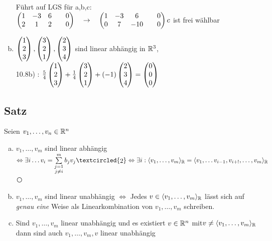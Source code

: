 \begin{enumerate}[a)]
Führt auf LGS für a,b,c:\\
$\begin{pmatrix}
1&-3&6&&0\\
2&1&2&&0
\end{pmatrix}\quad\rightarrow\quad \begin{pmatrix}
1&-3&6&&0\\
0&7&-10&&0
\end{pmatrix}\\
c$ ist frei wählbar
\item $\begin{pmatrix} 1\\2\\3 \end{pmatrix}, \begin{pmatrix} 3\\2\\1 \end{pmatrix}, \begin{pmatrix} 2\\3\\4 \end{pmatrix}$ sind linear abhängig in $\mathbb{R}^3$,\\
10.8b) : $\frac54 \begin{pmatrix} 1\\2\\3 \end{pmatrix} + \frac14 \begin{pmatrix} 3\\2\\1 \end{pmatrix} + (-1)\begin{pmatrix} 2\\3\\4 \end{pmatrix} = \begin{pmatrix} 0\\0\\0 \end{pmatrix}$
\end{enumerate}
\subsection{Satz}\label{sec:0.11}
Seien $v_1,\ldots,v_n \in \mathbb{R}^n$
\begin{enumerate}[a)]
\item $v_1,\ldots,v_m$ sind linear abhängig \textcircled{\raisebox{-1pt}{1}}\\
$\Leftrightarrow \exists i \ldots v_i = \sum\limits^{m}_{\substack{j=1\\j\ne i} }b_jv_j \textcircled{\raisebox{-1pt}{2}} \\\Leftrightarrow \exists i : \langle v_1,\ldots,v_m \rangle_\R = \langle v_1, \ldots v_{i-1}, v_{i+!},\ldots,v_m\rangle_\R$\textcircled{\raisebox{-1pt}{3}}
\item $v_1,\ldots,v_m$ sind linear unabhängig $\Leftrightarrow$ Jedes $v \in \langle v_1,\ldots,v_m\rangle_{\mathbb{R}}$ lässt sich auf \emph{genau eine} Weise als Linearkombination von $v_1,\ldots,v_m$ schreiben.
\item Sind $v_1,\ldots,v_m$ linear unabhängig und es existiert $v \in \mathbb{R}^n$ mit$ v \ne \langle v_1,\ldots,v_m\rangle_{\mathbb{R}}$ dann sind auch $v_1,\ldots,v_m,v $ linear unabhängig
\end{enumerate}
